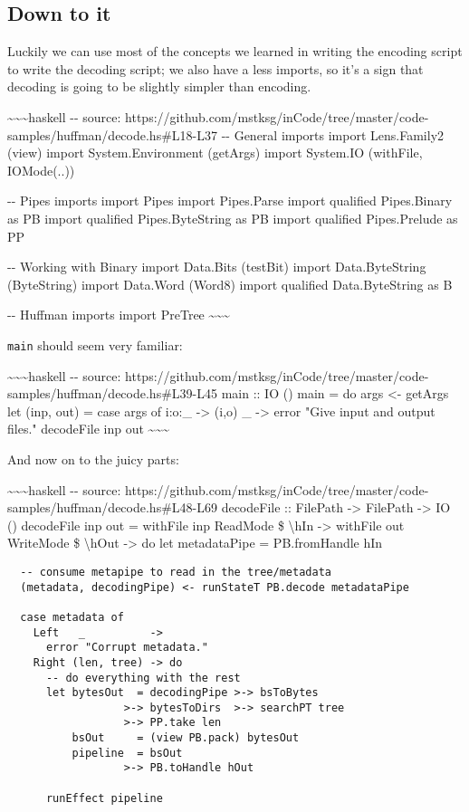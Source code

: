 \documentclass[]{article}
\begin{document}
\subsection{Down to it}

Luckily we can use most of the concepts we learned in writing the encoding
script to write the decoding script; we also have a less imports, so it's a sign
that decoding is going to be slightly simpler than encoding.

\textasciitilde{}\textasciitilde{}\textasciitilde{}haskell -\/- source:
https://github.com/mstksg/inCode/tree/master/code-samples/huffman/decode.hs\#L18-L37
-\/- General imports import Lens.Family2 (view) import System.Environment
(getArgs) import System.IO (withFile, IOMode(..))

-\/- Pipes imports import Pipes import Pipes.Parse import qualified Pipes.Binary
as PB import qualified Pipes.ByteString as PB import qualified Pipes.Prelude as
PP

-\/- Working with Binary import Data.Bits (testBit) import Data.ByteString
(ByteString) import Data.Word (Word8) import qualified Data.ByteString as B

-\/- Huffman imports import PreTree
\textasciitilde{}\textasciitilde{}\textasciitilde{}

\texttt{main} should seem very familiar:

\textasciitilde{}\textasciitilde{}\textasciitilde{}haskell -\/- source:
https://github.com/mstksg/inCode/tree/master/code-samples/huffman/decode.hs\#L39-L45
main :: IO () main = do args \textless{}- getArgs let (inp, out) = case args of
i:o:\_ -\textgreater{} (i,o) \_ -\textgreater{} error "Give input and output
files." decodeFile inp out \textasciitilde{}\textasciitilde{}\textasciitilde{}

And now on to the juicy parts:

\textasciitilde{}\textasciitilde{}\textasciitilde{}haskell -\/- source:
https://github.com/mstksg/inCode/tree/master/code-samples/huffman/decode.hs\#L48-L69
decodeFile :: FilePath -\textgreater{} FilePath -\textgreater{} IO () decodeFile
inp out = withFile inp ReadMode \$ \textbackslash{}hIn -\textgreater{} withFile
out WriteMode \$ \textbackslash{}hOut -\textgreater{} do let metadataPipe =
PB.fromHandle hIn

\begin{verbatim}
  -- consume metapipe to read in the tree/metadata
  (metadata, decodingPipe) <- runStateT PB.decode metadataPipe

  case metadata of
    Left   _          ->
      error "Corrupt metadata."
    Right (len, tree) -> do
      -- do everything with the rest
      let bytesOut  = decodingPipe >-> bsToBytes
                  >-> bytesToDirs  >-> searchPT tree
                  >-> PP.take len
          bsOut     = (view PB.pack) bytesOut
          pipeline  = bsOut
                  >-> PB.toHandle hOut

      runEffect pipeline
\end{verbatim}
\end{document}
